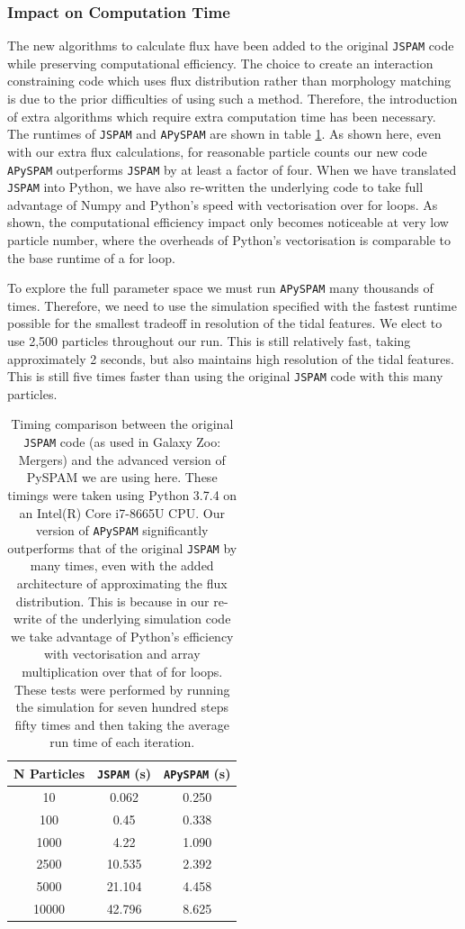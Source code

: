 \subsubsection{Impact on Computation Time}
The new algorithms to calculate flux have been added to the original \texttt{JSPAM} code while preserving computational efficiency. The choice to create an interaction constraining code which uses flux distribution rather than morphology matching is due to the prior difficulties of using such a method. Therefore, the introduction of extra algorithms which require extra computation time has been necessary. The runtimes of \texttt{JSPAM} and \texttt{APySPAM} are shown in table \ref{tab:timings}. As shown here, even with our extra flux calculations, for reasonable particle counts our new code \texttt{APySPAM} outperforms \texttt{JSPAM} by at least a factor of four. When we have translated \texttt{JSPAM} into Python, we have also re-written the underlying code to take full advantage of Numpy and Python's speed with vectorisation over for loops. As shown, the computational efficiency impact only becomes noticeable at very low particle number, where the overheads of Python's vectorisation is comparable to the base runtime of a for loop.

To explore the full parameter space we must run \texttt{APySPAM} many thousands of times. Therefore, we need to use the simulation specified with the fastest runtime possible for the smallest tradeoff in resolution of the tidal features. We elect to use 2,500 particles throughout our run. This is still relatively fast, taking approximately 2 seconds, but also maintains high resolution of the tidal features. This is still five times faster than using the original \texttt{JSPAM} code with this many particles. 

\begin{table}
\centering
\begin{tabular}{|c|c|c|}
\hline
N Particles & \texttt{JSPAM} (s) & \texttt{APySPAM} (s) \\
\hline
10 & 0.062 & 0.250 \\
100 & 0.45 & 0.338 \\
1000 & 4.22 & 1.090 \\
2500 & 10.535 & 2.392 \\
5000 & 21.104 & 4.458 \\
10000 & 42.796 & 8.625 \\
\hline
\end{tabular}
\caption{Timing comparison between the original \texttt{JSPAM} code (as used in Galaxy Zoo: Mergers) and the advanced version of PySPAM we are using here. These timings were taken using Python 3.7.4 on an Intel(R) Core i7-8665U CPU. Our version of \texttt{APySPAM} significantly outperforms that of the original \texttt{JSPAM} by many times, even with the added architecture of approximating the flux distribution. This is because in our re-write of the underlying simulation code we take advantage of Python's efficiency with vectorisation and array multiplication over that of for loops. These tests were performed by running the simulation for seven hundred steps fifty times and then taking the average run time of each iteration.}
\label{tab:timings}
\end{table}


